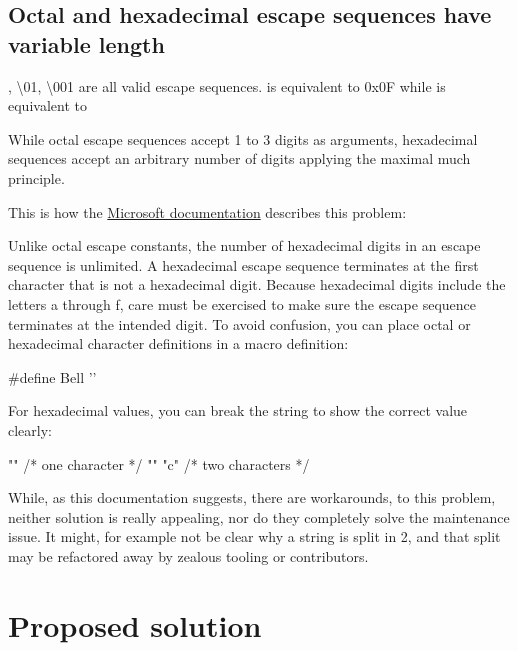 \documentclass{wg21}
\begin{document}
\subsection{Octal and hexadecimal escape sequences have variable length}

, {\textbackslash 01}, {\textbackslash 001} are all valid escape sequences.
 is equivalent to 0x0F while  is equivalent to 

While octal escape sequences accept 1 to 3 digits as arguments, hexadecimal sequences accept an arbitrary number of digits
applying the maximal much principle.


This is how the \href{https://docs.microsoft.com/en-us/cpp/c-language/octal-and-hexadecimal-character-specifications?view=msvc-160}{Microsoft documentation} describes this problem:

\begin{quoteblock}
    
    Unlike octal escape constants, the number of hexadecimal digits in an escape sequence is unlimited. A hexadecimal escape sequence terminates at the first character that is not a hexadecimal digit. Because hexadecimal digits include the letters a through f, care must be exercised to make sure the escape sequence terminates at the intended digit. To avoid confusion, you can place octal or hexadecimal character definitions in a macro definition:
    
    \begin{colorblock}
        #define Bell ''
    \end{colorblock}
    
    For hexadecimal values, you can break the string to show the correct value clearly:
    
    \begin{colorblock}
        "\xabc"    /* one character  */
        "\xab" "c" /* two characters */
    \end{colorblock}
    
\end{quoteblock}

While, as this documentation suggests, there are workarounds, to this problem, neither solution is really appealing, nor do
they completely solve the maintenance issue. It might, for example not be clear why a string is split in 2, and that split may
be refactored away by zealous tooling or contributors.

\section{Proposed solution}
\end{document}
